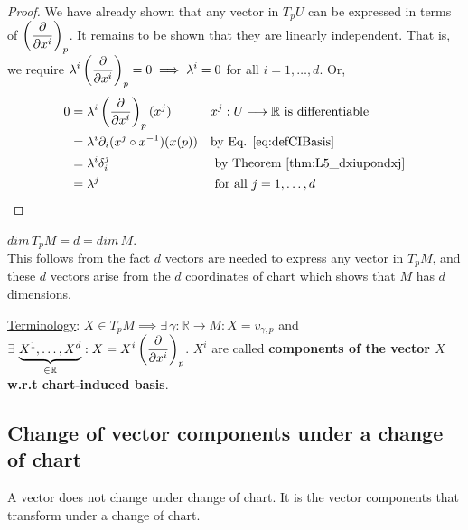 \begin{proof} We have already shown that any vector in $T_pU$ can be expressed in terms of $\displaystyle\left(\frac{\partial }{\partial x^i}\right)_p$. It remains to be shown that they are linearly independent. That is, we require $\displaystyle\lambda^i \left(\frac{\partial }{\partial x^i}\right)_p = 0 \implies \lambda^i = 0$ for all $i = 1, \dotsc, d$. Or,
\begin{align*}
0 & = \lambda^i \left(\frac{\partial }{\partial x^i}\right)_p(x^j) && x^j : U \longrightarrow \mathbb{R} \text{ is differentiable}\\
& = \lambda^i \partial_i (x^j \circ x^{-1})(x(p)) && \text{by Eq. \ref{eq:defCIBasis}} \\
& = \lambda^i \delta^j_i && \text{ by Theorem \ref{thm:L5_dxiupondxj}} \\
& = \lambda^j && \text{ for all } j = 1, \dotsc, d 
\end{align*}
\end{proof}

\begin{corollary}
$dim \, T_pM = d = dim \, M$. \\
This follows from the fact $d$ vectors are needed to express any vector in $T_pM$, and these $d$ vectors arise from the $d$ coordinates of chart which shows that $M$ has $d$ dimensions.
\end{corollary}

\underline{Terminology}: $X \in T_pM \implies \exists \, \gamma : \mathbb{R} \to M : X = v_{\gamma,p}$ and $\displaystyle \exists \, \underbrace{X^1, \dotsc, X^d}_{\in \mathbb{R}} : X = X^i \left(\frac{\partial }{\partial x^i}\right)_p$. $X^i$ are called \textbf{components of the vector $X$ w.r.t chart-induced basis}.

\subsection{Change of vector components under a change of chart}
 A vector does not change under change of chart. It is the vector components that transform under a change of chart.


